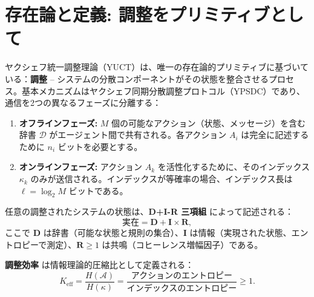 \documentclass[12pt,a4paper]{article}
\newcommand{\Keff}{K_{\mathrm{eff}}}
\begin{document}
	\section{存在論と定義: 調整をプリミティブとして}
	\label{sec:ontology}
	
	ヤクシェフ統一調整理論（YUCT）は、唯一の存在論的プリミティブに基づいている：\textbf{調整} – システムの分散コンポーネントがその状態を整合させるプロセス。基本メカニズムはヤクシェフ同期分散調整プロトコル（YPSDC）であり、通信を2つの異なるフェーズに分離する：
	\begin{enumerate}
		\item \textbf{オフラインフェーズ:} \(M\) 個の可能なアクション（状態、メッセージ）を含む辞書 \(\mathcal{D}\) がエージェント間で共有される。各アクション \(A_i\) は完全に記述するために \(n_i\) ビットを必要とする。
		\item \textbf{オンラインフェーズ:} アクション \(A_k\) を活性化するために、そのインデックス \(\kappa_k\) のみが送信される。インデックスが等確率の場合、インデックス長は \(\ell = \log_2 M\) ビットである。
	\end{enumerate}
	
	任意の調整されたシステムの状態は、\textbf{D+I-R 三項組} によって記述される：
	\[
	\text{実在} = \mathbf{D} + \mathbf{I} \times \mathbf{R},
	\]
	ここで \(\mathbf{D}\) は辞書（可能な状態と規則の集合）、\(\mathbf{I}\) は情報（実現された状態、エントロピーで測定）、\(\mathbf{R} \ge 1\) は共鳴（コヒーレンス増幅因子）である。
	
	\textbf{調整効率} は情報理論的圧縮比として定義される：
	\begin{equation}
		\Keff = \frac{H(\mathcal{A})}{H(\kappa)} = \frac{\text{アクションのエントロピー}}{\text{インデックスのエントロピー}} \ge 1.
		\label{eq:keff-def}
	\end{equation}
	
	\begin{center}
	\end{center}
	
\end{document}
